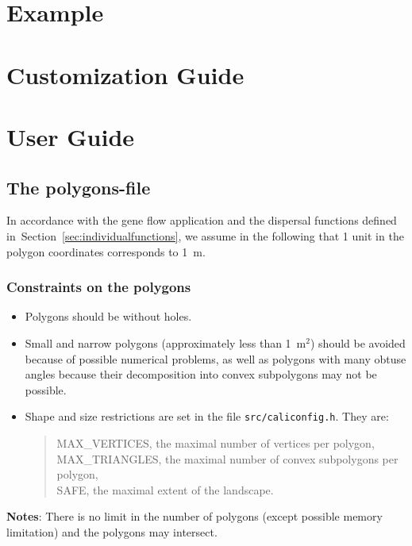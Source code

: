 \documentclass[a4paper,twoside,openright]{report}
\begin{document}



\part{Example}



\part{Customization Guide}


\part{User Guide}

\chapter{The polygons-file}
\label{polygon-file}
In accordance with the gene flow application and the dispersal
functions defined in~Section~\ref{sec:individualfunctions},
we assume in the following that 1 unit in the polygon coordinates
corresponds to 1~m.
\section{Constraints on the polygons}
\begin{itemize}
\item
Polygons should be without holes.
\item
Small and  narrow polygons (approximately
less than 1~m$^2$) should be avoided
because of possible numerical  problems,
as well as polygons with
many obtuse angles because
their decomposition into convex subpolygons
may not be possible.


\item
Shape and size restrictions  are set
in the  file \texttt{src/caliconfig.h}.
They are:
\begin{verse}
 MAX\_VERTICES, the  maximal number of vertices per polygon,\\
 MAX\_TRIANGLES, the maximal number of convex subpolygons per polygon,\\
 SAFE, the maximal extent of the landscape.
\end{verse}

\end{itemize}

\textbf{Notes}:
There is no limit in the number of polygons
(except possible memory limitation)
and the polygons may intersect.
\end{document}
